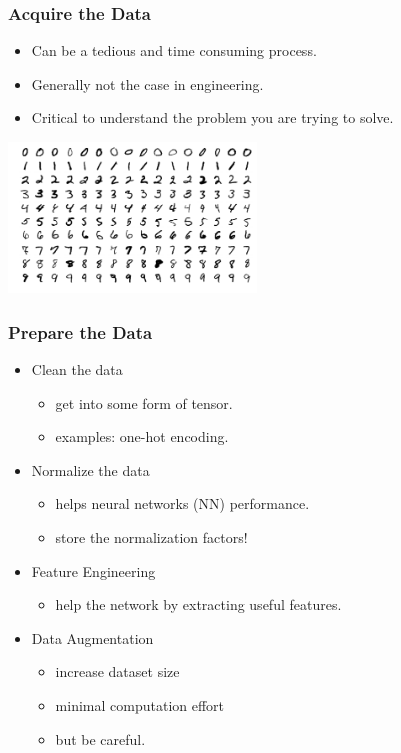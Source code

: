 \documentclass{beamer}
\begin{document}
\begin{frame}

    \frametitle{Acquire the Data}

    \begin{itemize}
        \item Can be a tedious and time consuming process.
        \item Generally not the case in engineering.
        \item Critical to understand the problem you are trying to solve.
    \end{itemize}

    \begin{center}
        \includegraphics[height=4cm]{figs/mnist_examples.png}
    \end{center}

\end{frame}


\begin{frame}

    \frametitle{Prepare the Data}

    \begin{itemize}
        \item Clean the data
        \begin{itemize}
            \item get into some form of tensor.
            \item examples: one-hot encoding.
        \end{itemize}
        \item Normalize the data
        \begin{itemize}
            \item helps neural networks (NN) performance.
            \item store the normalization factors!
        \end{itemize}
        \item Feature Engineering
        \begin{itemize}
            \item help the network by extracting useful features.
        \end{itemize}
        \item Data Augmentation
        \begin{itemize}
            \item increase dataset size
            \item minimal computation effort
            \item but be careful.
        \end{itemize}
    \end{itemize}
\end{frame}
\end{document}
